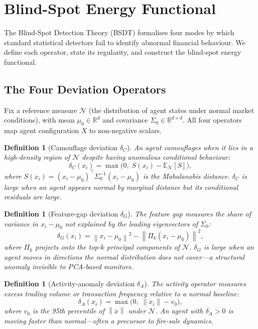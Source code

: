 \documentclass[11pt]{article}
\newtheorem{definition}[theorem]{Definition}
\theoremstyle{definition}
\newcommand{\R}{\mathbb{R}}
\newcommand{\E}{\mathbb{E}}
\newcommand{\norm}[1]{\left\|#1\right\|}
\begin{document}
\section{Blind-Spot Energy Functional}
\label{sec:bsdt}

The Blind-Spot Detection Theory (BSDT) formalises four modes by which standard
statistical detectors fail to identify abnormal financial behaviour.  We define each
operator, state its regularity, and construct the blind-spot energy functional.

\subsection{The Four Deviation Operators}

Fix a reference measure $\mathcal{N}$ (the distribution of agent states under normal
market conditions), with mean $\mu_0 \in \R^d$ and covariance $\Sigma_0 \in \R^{d \times d}$.
All four operators map agent configuration $X$ to non-negative scalars.

\begin{definition}[Camouflage deviation $\delta_C$]
An agent camouflages when it lies in a high-density region of $\mathcal{N}$ despite
having anomalous \emph{conditional} behaviour:
\[
  \delta_C(x_i) = \max\bigl(0,\; S(x_i) - \E_{\mathcal{N}}[S]\bigr),
\]
where $S(x_i) = (x_i - \mu_0)^\top \Sigma_0^{-1}(x_i - \mu_0)$ is the
Mahalanobis distance. $\delta_C$ is large when an agent appears normal by marginal
distance but its conditional residuals are large.
\end{definition}

\begin{definition}[Feature-gap deviation $\delta_G$]
The feature gap measures the share of variance in $x_i - \mu_0$ not explained by
the leading eigenvectors of $\Sigma_0$:
\[
  \delta_G(x_i) = \norm{x_i - \mu_0}^2 - \norm{\Pi_k(x_i - \mu_0)}^2,
\]
where $\Pi_k$ projects onto the top-$k$ principal components of $\mathcal{N}$.
$\delta_G$ is large when an agent moves in directions the normal distribution does
not cover---a structural anomaly invisible to PCA-based monitors.
\end{definition}

\begin{definition}[Activity-anomaly deviation $\delta_A$]
The activity operator measures excess trading volume or transaction frequency
relative to a normal baseline:
\[
  \delta_A(x_i) = \max\bigl(0,\; \norm{\dot x_i} - v_0\bigr),
\]
where $v_0$ is the 95th percentile of $\norm{\dot x}$ under $\mathcal{N}$.
An agent with $\delta_A > 0$ is moving faster than normal---often a precursor to
fire-sale dynamics.
\end{definition}
\end{document}
